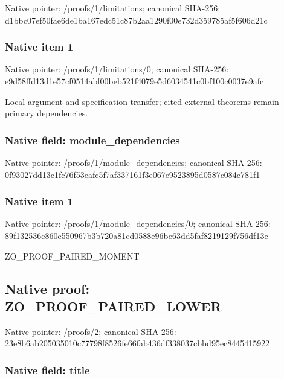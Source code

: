 \documentclass[10pt,a4paper]{article}
\begin{document}
Native pointer: /proofs/1/limitations; canonical SHA-256: d1bbc07ef50fae6de1ba167e\allowbreak{}dc51c87b2aa1290f00e732d3\allowbreak{}59785af5f606d21c



\subsubsection{Native item 1}


Native pointer: /proofs/1/limitations/0; canonical SHA-256: e9d58ffd13d1e57cf0514abf\allowbreak{}00beb521f4079e5d6034541c\allowbreak{}0bf100c0037e9afc


Local argument and specification transfer; cited external theorems remain primary dependencies.


\subsubsection{Native field: module\_dependencies}


Native pointer: /proofs/1/module\_dependencies; canonical SHA-256: 0f93027dd13c1fc76f53eafc\allowbreak{}5f7af337161f3e067e952389\allowbreak{}5d0587c084c781f1



\subsubsection{Native item 1}


Native pointer: /proofs/1/module\_dependencies/0; canonical SHA-256: 89f132536e860e550967b3b7\allowbreak{}20a81cd0588e96be63dd5faf\allowbreak{}8219129f756df13e


ZO\_PROOF\_PAIRED\_MOMENT


\subsection{Native proof: ZO\_PROOF\_PAIRED\_LOWER}


Native pointer: /proofs/2; canonical SHA-256: 23e8b6ab205035010c77798f\allowbreak{}8526fe66fab436df338037cb\allowbreak{}bd95ec8445415922



\subsubsection{Native field: title}
\end{document}
